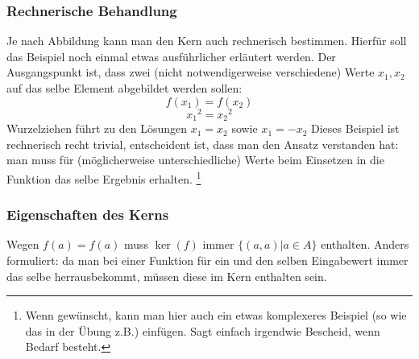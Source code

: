 \subsubsection{Rechnerische Behandlung}
Je nach Abbildung kann man den Kern auch rechnerisch bestimmen. Hierfür soll das Beispiel noch einmal etwas ausführlicher erläutert werden.
Der Ausgangspunkt ist, dass zwei (nicht notwendigerweise verschiedene) Werte $x_1, x_2$ auf das selbe Element abgebildet werden sollen:
$$  f(x_1) = f(x_2) $$
$$ {x_1}^2 = {x_2}^2$$
Wurzelziehen führt zu den Lösungen
$ x_1 = x_2 $ sowie $ x_1 = - x_2 $
Dieses Beispiel ist rechnerisch recht trivial, entscheident ist, dass man den Ansatz verstanden hat: 
man muss für (möglicherweise unterschiedliche) Werte beim Einsetzen in die Funktion das selbe Ergebnis erhalten.
\footnote{Wenn gewünscht, kann man hier auch ein etwas komplexeres Beispiel (so wie das in der Übung z.B.) einfügen. Sagt einfach irgendwie Bescheid, wenn Bedarf besteht.}


\subsubsection{Eigenschaften des Kerns}\label{kern_eigenschaften} 
Wegen $ f(a) = f(a) $ muss $\ker(f)$ immer $\{(a,a) | a \in {A} \}$ enthalten.
Anders formuliert: da man bei einer Funktion für ein und den selben Eingabewert immer das selbe herrausbekommt, müssen diese im Kern enthalten sein.

